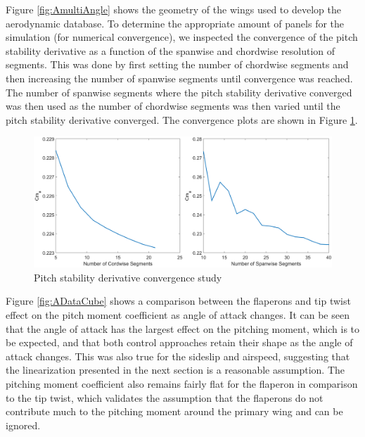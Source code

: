 \documentclass[11pt]{ucthesis}
\begin{document}
Figure \ref{fig:AmultiAngle} shows the geometry of the wings used to develop the aerodynamic database. To determine the appropriate amount of panels for the simulation (for numerical convergence), we inspected the convergence of the pitch stability derivative as a function of the spanwise and chordwise resolution of segments. This was done by first setting the number of chordwise segments and then increasing the number of spanwise segments until convergence was reached. The number of spanwise segments where the pitch stability derivative converged was then used as the number of chordwise segments was then varied until the pitch stability derivative converged. The convergence plots are shown in Figure \ref{fig:Aconverge}. 

\begin{figure}[thpb]
\centering
\includegraphics[width=1\linewidth]{Figures/SegmentConverge.png}
\caption{Pitch stability derivative convergence study}
\label{fig:Aconverge}
\end{figure}

Figure \ref{fig:ADataCube} shows a comparison between the flaperons and tip twist effect on the pitch moment coefficient as angle of attack changes. It can be seen that the angle of attack has the largest effect on the pitching moment, which is to be expected, and that both control approaches retain their shape as the angle of attack changes. This was also true for the sideslip and airspeed, suggesting that the linearization presented in the next section is a reasonable assumption. The pitching moment coefficient also remains fairly flat for the flaperon in comparison to the tip twist, which validates the assumption that the flaperons do not contribute much to the pitching moment around the primary wing and can be ignored.
\end{document}
